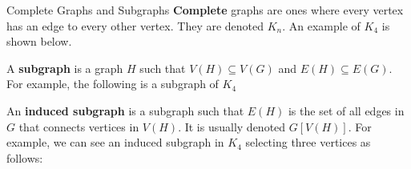 \documentclass[10pt]{extarticle}
\begin{document}
\begin{problem}{Complete Graphs and Subgraphs}
  \textbf{Complete} graphs are ones where every vertex has an edge to every other vertex. They are denoted $K_n$. An example of $K_4$ is shown below.
  \begin{center}
  \end{center}
  A \textbf{subgraph} is a graph $H$ such that $V(H) \subseteq V(G)$ and $E(H) \subseteq E(G)$. For example, the following is a subgraph of $K_4$
  \begin{center}
  \end{center}
  An \textbf{induced subgraph} is a subgraph such that $E(H)$ is the set of all edges in $G$ that connects vertices in $V(H)$. It is usually denoted $G[V(H)]$. For example, we can see an induced subgraph in $K_4$ selecting three vertices as follows:
  \begin{center}
  \end{center}
\end{problem}
\end{document}
